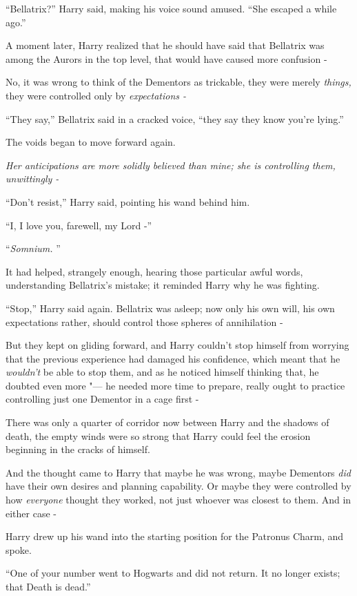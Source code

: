 ``Bellatrix?'' Harry said, making his voice sound amused. ``She escaped
a while ago.''

A moment later, Harry realized that he should have said that Bellatrix
was among the Aurors in the top level, that would have caused more
confusion -

No, it was wrong to think of the Dementors as trickable, they were
merely \emph{things,} they were controlled only by \emph{expectations -}

``They say,'' Bellatrix said in a cracked voice, ``they say they know
you're lying.''

The voids began to move forward again.

\emph{Her anticipations are more solidly believed than mine; she is
controlling them, unwittingly -}

``Don't resist,'' Harry said, pointing his wand behind him.

``I, I love you, farewell, my Lord -''

``\emph{Somnium.} ''

It had helped, strangely enough, hearing those particular awful words,
understanding Bellatrix's mistake; it reminded Harry why he was
fighting.

``Stop,'' Harry said again. Bellatrix was asleep; now only his own will,
his own expectations rather, should control those spheres of
annihilation -

But they kept on gliding forward, and Harry couldn't stop himself from
worrying that the previous experience had damaged his confidence, which
meant that he \emph{wouldn't} be able to stop them, and as he noticed
himself thinking that, he doubted even more "--- he needed more time to
prepare, really ought to practice controlling just one Dementor in a
cage first -

There was only a quarter of corridor now between Harry and the shadows
of death, the empty winds were so strong that Harry could feel the
erosion beginning in the cracks of himself.

And the thought came to Harry that maybe he was wrong, maybe Dementors
\emph{did} have their own desires and planning capability. Or maybe they
were controlled by how \emph{everyone} thought they worked, not just
whoever was closest to them. And in either case -

Harry drew up his wand into the starting position for the Patronus
Charm, and spoke.

``One of your number went to Hogwarts and did not return. It no longer
exists; that Death is dead.''


